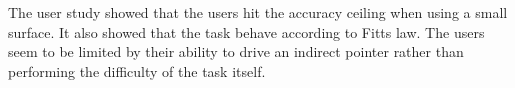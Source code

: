 \documentclass{chi-ext}
\begin{document}
The user study showed that the users hit the accuracy ceiling when using a small surface. It also showed that the task behave according to Fitts law. The users seem to be limited by their ability to drive an indirect pointer rather than performing the difficulty of the task itself.
\end{document}
